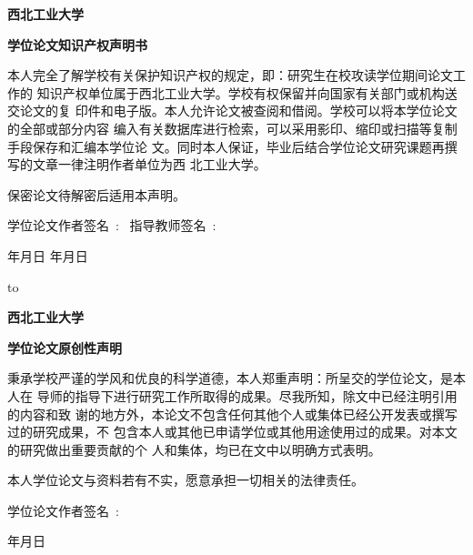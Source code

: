 \begin{titlepage}
    \linespread{1.5}
    \parskip=7pt
    \vspace*{0pt}
    \fSong\sSihao
    \centerline{\bf 西北工业大学}
    \centerline{\bf 学位论文知识产权声明书}
    \fSong\sWuhao
    本人完全了解学校有关保护知识产权的规定，即：研究生在校攻读学位期间论文工作的
    知识产权单位属于西北工业大学。学校有权保留并向国家有关部门或机构送交论文的复
    印件和电子版。本人允许论文被查阅和借阅。学校可以将本学位论文的全部或部分内容
    编入有关数据库进行检索，可以采用影印、缩印或扫描等复制手段保存和汇编本学位论
    文。同时本人保证，毕业后结合学位论文研究课题再撰写的文章一律注明作者单位为西
    北工业大学。
    \par 保密论文待解密后适用本声明。
    \par
    学位论文作者签名{~:~}\underline{\qquad\qquad\qquad} \hfill
    指导教师签名{~:~}\underline{\qquad\qquad\qquad} \par
    \hskip 3cm {年\qquad 月\qquad 日} \hfill\hskip 3cm {年\qquad 月\qquad 日}
    \vspace*{30pt}

    \hbox to 

    \vspace*{50pt}
    \fSong\sSihao
    \centerline{\bf 西北工业大学}
    \centerline{\bf 学位论文原创性声明}
    \fSong\sWuhao
    秉承学校严谨的学风和优良的科学道德，本人郑重声明：所呈交的学位论文，是本人在
    导师的指导下进行研究工作所取得的成果。尽我所知，除文中已经注明引用的内容和致
    谢的地方外，本论文不包含任何其他个人或集体已经公开发表或撰写过的研究成果，不
    包含本人或其他已申请学位或其他用途使用过的成果。对本文的研究做出重要贡献的个
    人和集体，均已在文中以明确方式表明。
    \par 本人学位论文与资料若有不实，愿意承担一切相关的法律责任。
    \par
    \hskip5.5cm
    \hfill 学位论文作者签名{~:~}\underline{\qquad\qquad\qquad}\par
    \hfill\hskip8.5cm {年\qquad 月\qquad 日}
\end{titlepage}
\endinput